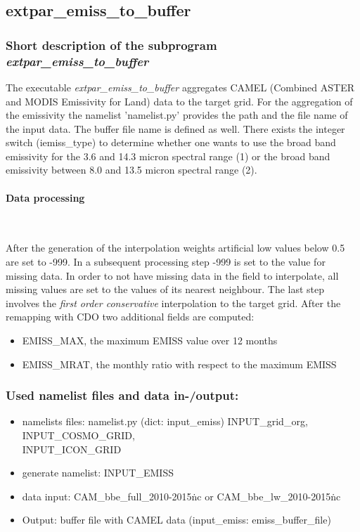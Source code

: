 \documentclass[a4paper,10pt,DIV14,BCOR1cm,titlepage,twoside]{scrartcl}
\begin{document}
\subsection{extpar\_emiss\_to\_buffer}\label{extpar_emiss_to_buffer}
\subsubsection{Short description of the subprogram \textit{extpar\_emiss\_to\_buffer}}
The executable \textit{extpar\_emiss\_to\_buffer} aggregates CAMEL (Combined ASTER and MODIS Emissivity for Land) data  to the target grid.
For the aggregation of the emissivity the namelist 'namelist.py' provides the path and the file name of the input data. The buffer file name is defined as well. There exists the integer switch (iemiss\_type)
to determine whether one wants to use the broad band emissivity for the 3.6 and 14.3 micron spectral range
(1) or the broad band emissivity between 8.0 and 13.5 micron spectral range (2).

\paragraph{Data processing} \ \par\medskip\noindent
After the generation of the interpolation weights artificial low values below 0.5 are set to -999. In a subsequent processing step -999 is set to the value for missing data.
In order to not have missing data in the field to interpolate, all missing values are set to the values of its nearest neighbour.
The last step involves the \textit{first order conservative} interpolation to the target grid. After the remapping with CDO two additional fields are computed:
\begin{itemize}
  \item EMISS\_MAX, the maximum EMISS value over 12 months
  \item EMISS\_MRAT, the monthly ratio with respect to the maximum EMISS
\end{itemize}

\subsubsection{Used namelist files and data in-/output:}
\begin{itemize}
  \item namelists files: namelist.py (dict: input\_emiss) INPUT\_grid\_org, INPUT\_COSMO\_GRID, \\
          INPUT\_ICON\_GRID
  \item generate namelist: INPUT\_EMISS
  \item data input: CAM\_bbe\_full\_2010-2015\.nc or CAM\_bbe\_lw\_2010-2015\.nc
  \item Output: buffer file with CAMEL data (input\_emiss: emiss\_buffer\_file)
\end{itemize}
\end{document}
